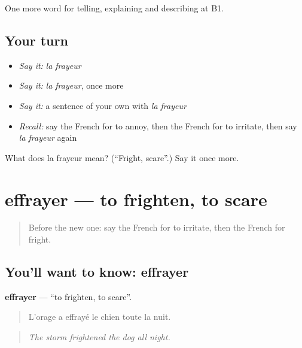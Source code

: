 \begin{grammarlens}[title={What you've built}]
One more word for telling, explaining and describing at B1.
\end{grammarlens}

\subsection*{Your turn}
\begin{itemize}
\raggedright
  \item \emph{Say it:} \emph{la frayeur}
  \item \emph{Say it:} \emph{la frayeur}, once more
  \item \emph{Say it:} a sentence of your own with \emph{la frayeur}
  \item \emph{Recall:} say the French for to annoy, then the French for to irritate, then say \emph{la frayeur} again
\end{itemize}

\begin{tcolorbox}[breakable,colback=teal!4,colframe=teal!35!black,title={Before you move on}]
What does la frayeur mean? (\textquotedblleft{}Fright, scare\textquotedblright{}.) Say it once more.
\end{tcolorbox}
\section[effrayer]{effrayer — to frighten, to scare}

\label{lesson:FR-C470-effrayer}



\begin{quote}
Before the new one: say the French for to irritate, then the French for fright.
\end{quote}

\subsection*{You'll want to know: effrayer}
\textbf{effrayer} — \textquotedblleft{}to frighten, to scare\textquotedblright{}.

\begin{quote}
L'orage a effrayé le chien toute la nuit.
\end{quote}

\begin{quote}
\emph{The storm frightened the dog all night.}
\end{quote}

